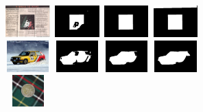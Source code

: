 \documentclass[10pt,twocolumn,letterpaper]{article}
\begin{document}
\begin{figure}[h]
\begin{center}
    \includegraphics[width=0.7in,height=0.48in]{./Figures/Lambda/5_145_145612.jpg}
    \includegraphics[width=0.7in,height=0.48in]{./Figures/Lambda/5_145_145612_2.jpg}
    \includegraphics[width=0.7in,height=0.48in]{./Figures/Lambda/5_145_145612_3.jpg} 
    \includegraphics[width=0.7in,height=0.48in]{./Figures/Lambda/5_145_145612_4.jpg} \\
    \includegraphics[width=0.7in,height=0.48in]{./Figures/Lambda/5_154_154292.jpg}
    \includegraphics[width=0.7in,height=0.48in]{./Figures/Lambda/5_154_154292_2.jpg}
    \includegraphics[width=0.7in,height=0.48in]{./Figures/Lambda/5_154_154292_3.jpg} 
    \includegraphics[width=0.7in,height=0.48in]{./Figures/Lambda/5_154_154292_4.jpg} \\
    \includegraphics[width=0.7in,height=0.48in]{./Figures/Lambda/5_154_154732.jpg}

\end{center}
\end{figure}
\end{document}
